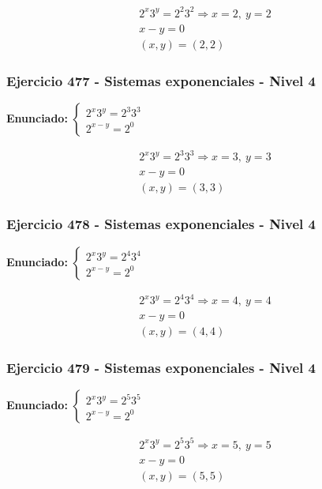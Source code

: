 \documentclass[12pt,a4paper]{article}
\begin{document}
\[
\begin{aligned}
2^x3^y=2^{2}3^{2}\Rightarrow x=2,\ y=2\\
x-y=0\\
\boxed{(x,y)=(2,2)}
\end{aligned}
\]


\subsubsection*{Ejercicio 477 - Sistemas exponenciales - Nivel 4}
\textbf{Enunciado:} \(\begin{cases} 2^x3^y=2^{3}3^{3}\\ 2^{x-y}=2^{0}\end{cases}\)

\[
\begin{aligned}
2^x3^y=2^{3}3^{3}\Rightarrow x=3,\ y=3\\
x-y=0\\
\boxed{(x,y)=(3,3)}
\end{aligned}
\]


\subsubsection*{Ejercicio 478 - Sistemas exponenciales - Nivel 4}
\textbf{Enunciado:} \(\begin{cases} 2^x3^y=2^{4}3^{4}\\ 2^{x-y}=2^{0}\end{cases}\)

\[
\begin{aligned}
2^x3^y=2^{4}3^{4}\Rightarrow x=4,\ y=4\\
x-y=0\\
\boxed{(x,y)=(4,4)}
\end{aligned}
\]


\subsubsection*{Ejercicio 479 - Sistemas exponenciales - Nivel 4}
\textbf{Enunciado:} \(\begin{cases} 2^x3^y=2^{5}3^{5}\\ 2^{x-y}=2^{0}\end{cases}\)

\[
\begin{aligned}
2^x3^y=2^{5}3^{5}\Rightarrow x=5,\ y=5\\
x-y=0\\
\boxed{(x,y)=(5,5)}
\end{aligned}
\]
\end{document}

